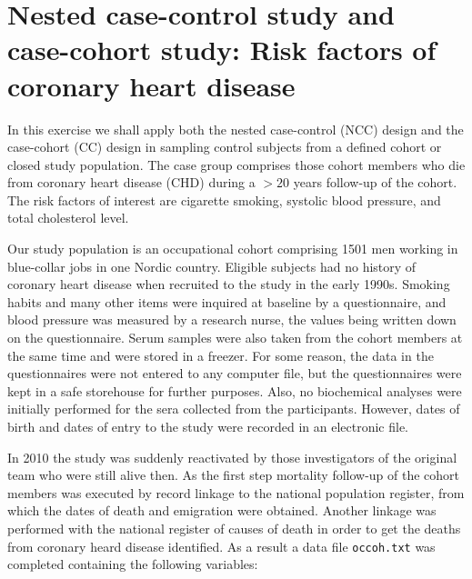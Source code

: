 \documentclass[
]{book}
\begin{document}
\chapter{Nested case-control study and case-cohort study: Risk factors of coronary heart disease}\label{nested-case-control-study-and-case-cohort-study-risk-factors-of-coronary-heart-disease}

In this exercise we shall apply both the nested case-control (NCC)
design and the case-cohort (CC) design in sampling
control subjects from a defined cohort or closed study population.
The case group comprises those cohort members who die from coronary heart disease (CHD) during a \(> 20\) years follow-up of the cohort.\\
The risk factors of interest are cigarette smoking, systolic blood pressure, and total cholesterol level.

Our study population is an occupational cohort comprising 1501 men
working in blue-collar jobs in one Nordic country.
Eligible subjects had no history of coronary heart disease
when recruited to the study in the early 1990s.
Smoking habits and many other items were inquired at baseline
by a questionnaire, and
blood pressure was measured by a research nurse, the values being
written down on the questionnaire. Serum samples were also taken from the cohort members at the same time and were stored in a freezer. For some reason,
the data in the questionnaires were not entered to any computer file, but the questionnaires were kept in a safe storehouse for further purposes.
Also, no biochemical analyses were initially performed for the sera
collected from the participants. However, dates of birth and dates of entry to the study were recorded
in an electronic file.

In 2010 the study was suddenly reactivated by those investigators of the original team who were still alive then.
As the first step mortality follow-up of the cohort members was
executed by record linkage to the national population register, from which
the dates of death and emigration were obtained. Another linkage was performed with the national register of causes of death in order to get the
deaths from coronary heard disease identified. As a result a data file
\texttt{occoh.txt} was completed containing the following variables:
\end{document}
